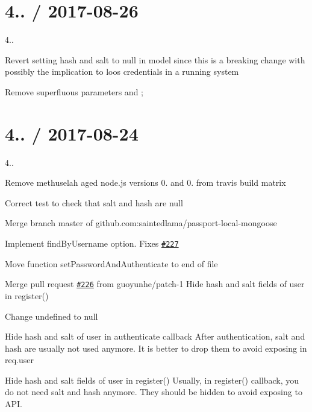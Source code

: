 \section*{4.. / 2017-\/08-\/26 }


\begin{DoxyItemize}
\item 4..
\item Revert setting hash and salt to null in model since this is a breaking change with possibly the implication to loos credentials in a running system
\item Remove superfluous parameters and ;
\end{DoxyItemize}

\section*{4.. / 2017-\/08-\/24 }


\begin{DoxyItemize}
\item 4..
\item Remove methuselah aged node.\+js versions 0. and 0. from travis build matrix
\item Correct test to check that salt and hash are null
\item Merge branch \textquotesingle{}master\textquotesingle{} of github.\+com\+:saintedlama/passport-\/local-\/mongoose
\item Implement find\+By\+Username option. Fixes \href{https://github.com/saintedlama/passport-local-mongoose/issues/227}{\tt \#227}
\item Move function set\+Password\+And\+Authenticate to end of file
\item Merge pull request \href{https://github.com/saintedlama/passport-local-mongoose/issues/226}{\tt \#226} from guoyunhe/patch-\/1 Hide hash and salt fields of user in register()
\item Change undefined to null
\item Hide hash and salt of user in authenticate callback After authentication, salt and hash are usually not used anymore. It is better to drop them to avoid exposing in {\ttfamily req.\+user}
\item Hide hash and salt fields of user in register() Usually, in {\ttfamily register()} callback, you do not need salt and hash anymore. They should be hidden to avoid exposing to A\+PI.
\end{DoxyItemize}

